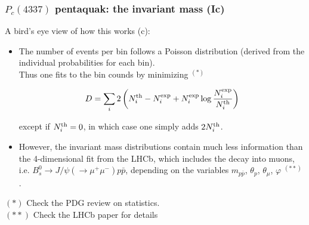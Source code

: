 \documentclass[utf8,10pt]{beamer}
\begin{document}
\begin{frame}
\frametitle{$P_{c}(4337)$ pentaquak: the invariant mass (Ic)}

A bird's eye view of how this works (c): 

\begin{itemize}
\item[(v)] The number of events per bin follows a Poisson distribution (derived from the individual probabilities for each bin). \\
  \vspace{0.15cm}
  Thus one fits to the bin counds by minimizing {\color{magenta} ${}^{(*)}$ }

  {\small
    $$
    D = \sum_i 2\left( N_i^{\rm th} - N_i^{\rm exp} + N_i^{\rm exp} \log{\frac{N_i^{\rm exp}}{N_i^{\rm th}}} \right)
    $$
  }

  except if $N_i^{\rm th} = 0$, in which case one simply adds $2 N_i^{\rm th}$.
  
\item[(vi)] However, the invariant mass distributions contain much less
  information   than the 4-dimensional fit from the LHCb, which includes
  the decay into muons, i.e. $B_s^0 \to J/\psi (\to \mu^+ \mu^-) p \bar{p}$,
  depending on the variables $m_{p\bar{p}}$, $\theta_p$, $\theta_{\mu}$,
  $\varphi$ {\color{magenta} ${}^{(**)}$ }.
\end{itemize}

{\scriptsize {\color{magenta} $(*)$} Check the PDG review on statistics.\\
  {\color{magenta} $(**)$} Check the LHCb paper for details}
\end{frame}
\end{document}
